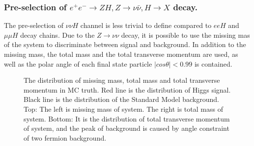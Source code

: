\documentclass[11pt,a4paper]{cepcnote}
\begin{document}
\subsubsection{Pre-selection of $e^+e^- \rightarrow ZH, Z\rightarrow \nu\bar{\nu}, H\rightarrow X$ decay.}
The pre-selection of $\nu\nu H$ channel is less trivial to define compared to
$eeH$ and $\mu\mu H$ decay chains. Due to the $Z\to\nu\nu$ decay, it is 
possible to use the missing mas of the system to discriminate between signal 
and background. In addition to the missing mass, the total mass
and the total transverse momentum are used, as well as {\color{blue}the polar angle of each final state particle
$|cos\theta| < 0.99$ is contained}.
\begin{figure}[H]
	\centering
	\caption[]{The distribution of missing mass, total mass and total transverse momentum in MC truth. 
	Red line is the distribution of Higgs signal. Black line is the distribution of the Standard Model background.
	Top: The left is missing mass of system. The right is total mass of system.
	Bottom: It is the distribution of total transverse momentum of system, and the peak of background is caused by angle constraint of 
	two fermion background.}
	\label{fig:nnHfilter}
\end{figure}
\end{document}

